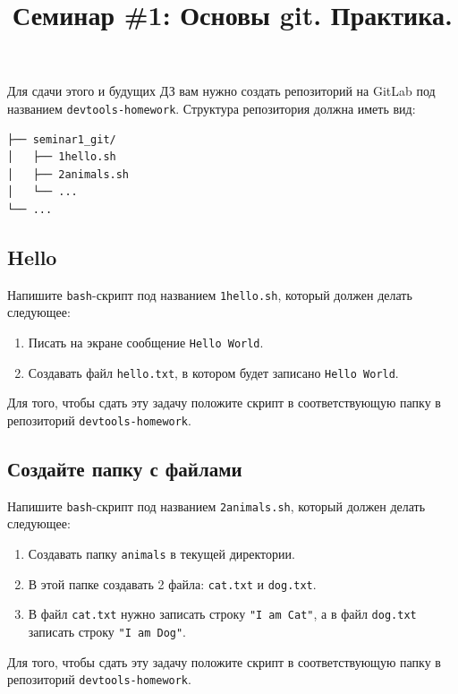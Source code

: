 \documentclass{article}
\begin{document}
\title{Семинар \#1: Основы git. Практика. \vspace{-5ex}}\date{}\maketitle
Для сдачи этого и будущих ДЗ вам нужно создать репозиторий на GitLab под названием \texttt{devtools-homework}. Структура репозитория должна иметь вид:
\begin{center}
\begin{BVerbatim}
├── seminar1_git/
│   ├── 1hello.sh
│   ├── 2animals.sh
│   └── ...
└── ...
\end{BVerbatim}
\end{center}
\subsection{Hello}
Напишите \texttt{bash}-скрипт под названием \texttt{1hello.sh}, который должен делать следующее:
\begin{enumerate}
\item Писать на экране сообщение \texttt{Hello World}.
\item Создавать файл \texttt{hello.txt}, в котором будет записано \texttt{Hello World}.
\end{enumerate}
Для того, чтобы сдать эту задачу положите скрипт в соответствующую папку в репозиторий \texttt{devtools-homework}. 


\subsection{Создайте папку с файлами}
Напишите \texttt{bash}-скрипт под названием \texttt{2animals.sh}, который должен делать следующее:
\begin{enumerate}
\item Создавать папку \texttt{animals} в текущей директории.
\item В этой папке создавать 2 файла: \texttt{cat.txt} и \texttt{dog.txt}.
\item В файл \texttt{cat.txt} нужно записать строку \texttt{"I am Cat"}, а в файл \texttt{dog.txt} записать строку \texttt{"I am Dog"}.
\end{enumerate}
Для того, чтобы сдать эту задачу положите скрипт в соответствующую папку в репозиторий \texttt{devtools-homework}.
\end{document}
